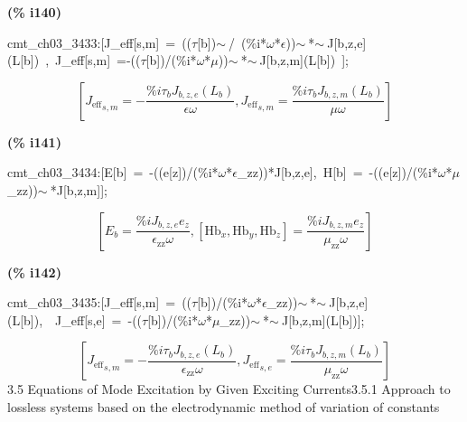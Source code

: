 \documentclass[fleqn]{article}
\begin{document}
\noindent
\begin{minipage}[t]{4.000000em}\color{red}\bfseries
(\% i140)	
\end{minipage}
\begin{minipage}[t]{\textwidth}\color{blue}
cmt\_ch03\_3433:[J\_eff[s,m]\ =\ ((\ensuremath{\tau}[b])\ensuremath{\sim\ }/\ (\%i*\ensuremath{\omega}*\ensuremath{\epsilon}))\ensuremath{\sim\ }*\ensuremath{\sim\ }J[b,z,e](L[b])\ ,\ J\_eff[s,m]\ =-((\ensuremath{\tau}[b])/(\%i*\ensuremath{\omega}*\ensuremath{\mu}))\ensuremath{\sim\ }*\ensuremath{\sim\ }J[b,z,m](L[b])\ ];
\end{minipage}
\[\displaystyle \tag{cmt\_ ch03\_ 3433} 
\left[ {{{J_{\ensuremath{\mathrm{eff}}}}}_{s,m}}=-\frac{\% i {{\tau }_b} {J_{b,z,e}}\left( {L_b}\right) }{\epsilon  \omega }\operatorname{,}{{{J_{\ensuremath{\mathrm{eff}}}}}_{s,m}}=\frac{\% i {{\tau }_b} {J_{b,z,m}}\left( {L_b}\right) }{\mu  \omega }\right] \mbox{}
\]


\noindent
\begin{minipage}[t]{4.000000em}\color{red}\bfseries
(\% i141)	
\end{minipage}
\begin{minipage}[t]{\textwidth}\color{blue}
cmt\_ch03\_3434:[E[b]\ =\ -((e[z])/(\%i*\ensuremath{\omega}*\ensuremath{\epsilon}\_zz))*J[b,z,e],\ H[b]\ =\ -((e[z])/(\%i*\ensuremath{\omega}*\ensuremath{\mu}\_zz))\ensuremath{\sim\ }*J[b,z,m]];
\end{minipage}
\[\displaystyle \tag{cmt\_ ch03\_ 3434} 
\left[ {E_b}=\frac{\% i {J_{b,z,e}} {e_z}}{{{\epsilon }_{\ensuremath{\mathrm{zz}}}} \omega }\operatorname{,}\left[ {{\ensuremath{\mathrm{Hb}}}_x}\operatorname{,}{{\ensuremath{\mathrm{Hb}}}_y}\operatorname{,}{{\ensuremath{\mathrm{Hb}}}_z}\right] =\frac{\% i {J_{b,z,m}} {e_z}}{{{\mu }_{\ensuremath{\mathrm{zz}}}} \omega }\right] \mbox{}
\]


\noindent
\begin{minipage}[t]{4.000000em}\color{red}\bfseries
(\% i142)	
\end{minipage}
\begin{minipage}[t]{\textwidth}\color{blue}
cmt\_ch03\_3435:[J\_eff[s,m]\ =\ ((\ensuremath{\tau}[b])/(\%i*\ensuremath{\omega}*\ensuremath{\epsilon}\_zz))\ensuremath{\sim\ }*\ensuremath{\sim\ }J[b,z,e](L[b]),\ \ J\_eff[s,e]\ =\ -((\ensuremath{\tau}[b])/(\%i*\ensuremath{\omega}*\ensuremath{\mu}\_zz))\ensuremath{\sim\ }*\ensuremath{\sim\ }J[b,z,m](L[b])];
\end{minipage}
\[\displaystyle \tag{cmt\_ ch03\_ 3435} 
\left[ {{{J_{\ensuremath{\mathrm{eff}}}}}_{s,m}}=-\frac{\% i {{\tau }_b} {J_{b,z,e}}\left( {L_b}\right) }{{{\epsilon }_{\ensuremath{\mathrm{zz}}}} \omega }\operatorname{,}{{{J_{\ensuremath{\mathrm{eff}}}}}_{s,e}}=\frac{\% i {{\tau }_b} {J_{b,z,m}}\left( {L_b}\right) }{{{\mu }_{\ensuremath{\mathrm{zz}}}} \omega }\right] \mbox{}
\]
3.5 Equations of Mode Excitation by Given Exciting Currents3.5.1 Approach to lossless systems based on the electrodynamic method of variation of constants
\end{document}
